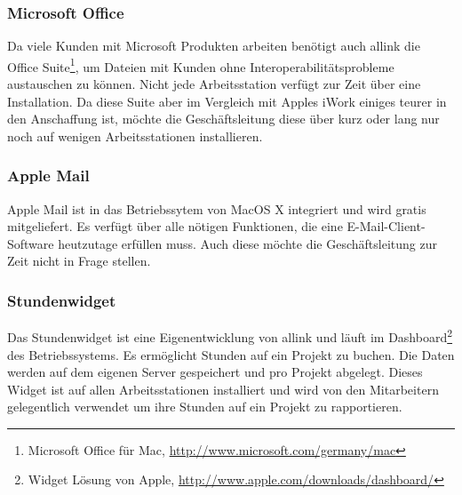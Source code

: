 \subsubsection{Microsoft Office}
Da viele Kunden mit Microsoft Produkten arbeiten benötigt auch allink die
Office Suite\footnote{Microsoft Office für Mac, \url{http://www.microsoft.com/germany/mac}}, 
um Dateien mit Kunden ohne Interoperabilitätsprobleme austauschen zu können. 
Nicht jede Arbeitsstation verfügt zur Zeit über eine Installation. Da diese
Suite aber im Vergleich mit Apples iWork einiges teurer in den Anschaffung ist,
möchte die Geschäftsleitung diese über kurz oder lang nur noch auf wenigen
Arbeitsstationen installieren.

\subsubsection{Apple Mail}
Apple Mail ist in das Betriebssytem von MacOS X integriert und wird gratis
mitgeliefert. Es verfügt über alle nötigen Funktionen, die eine E-Mail-Client-Software
heutzutage erfüllen muss. Auch diese möchte die Geschäftsleitung zur Zeit nicht
in Frage stellen.

\subsubsection{Stundenwidget}
Das Stundenwidget ist eine Eigenentwicklung von allink und läuft
im Dashboard\footnote{Widget Lösung von Apple, \url{http://www.apple.com/downloads/dashboard/}}
des Betriebssystems. Es ermöglicht Stunden auf ein Projekt zu buchen.
Die Daten werden auf dem eigenen Server gespeichert und pro Projekt abgelegt. Dieses Widget ist auf allen
Arbeitsstationen installiert und wird von den Mitarbeitern gelegentlich verwendet
um ihre Stunden auf ein Projekt zu rapportieren.
